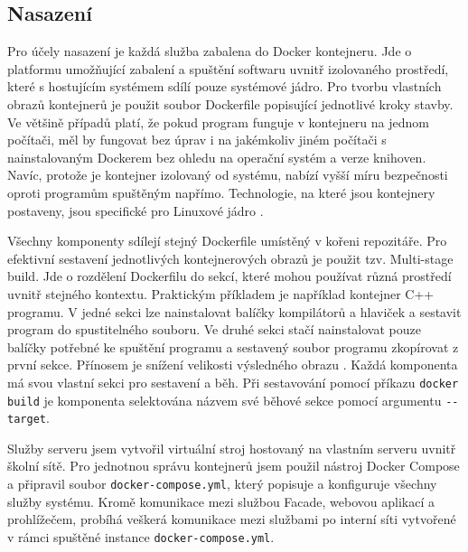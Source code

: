 \subsection{Nasazení}
Pro účely nasazení je každá služba zabalena do Docker kontejneru. Jde o platformu umožňující zabalení a spuštění softwaru uvnitř izolovaného prostředí, které s hostujícím systémem sdílí pouze systémové jádro. Pro tvorbu vlastních obrazů kontejnerů je použit soubor Dockerfile popisující jednotlivé kroky stavby. Ve většině případů platí, že pokud program funguje v kontejneru na jednom počítači, měl by fungovat bez úprav i na jakémkoliv jiném počítači s nainstalovaným Dockerem bez ohledu na operační systém a verze knihoven. Navíc, protože je kontejner izolovaný od systému, nabízí vyšší míru bezpečnosti oproti programům spuštěným napřímo. Technologie, na které jsou kontejnery postaveny, jsou specifické pro Linuxové jádro \cite{DockerOverview0200}. 

Všechny komponenty sdílejí stejný Dockerfile umístěný v kořeni repozitáře. Pro efektivní sestavení jednotlivých kontejnerových obrazů je použit tzv. Multi-stage build. Jde o rozdělení Dockerfilu do sekcí, které mohou používat různá prostředí uvnitř stejného kontextu. Praktickým příkladem je například kontejner C++ programu. V jedné sekci lze nainstalovat balíčky kompilátorů a hlaviček a sestavit program do spustitelného souboru. Ve druhé sekci stačí nainstalovat pouze balíčky potřebné ke spuštění programu a sestavený soubor programu zkopírovat z první sekce. Přínosem je snížení velikosti výsledného obrazu \cite{MultistageBuilds0100}. Každá komponenta má svou vlastní sekci pro sestavení a běh. Při sestavování pomocí příkazu \lstinline|docker build| je komponenta selektována názvem své běhové sekce pomocí argumentu \lstinline|--target|.

Služby serveru jsem vytvořil virtuální stroj hostovaný na vlastním serveru uvnitř školní sítě. Pro jednotnou správu kontejnerů jsem použil nástroj Docker Compose a připravil soubor \lstinline|docker-compose.yml|, který popisuje a konfiguruje všechny služby systému. Kromě komunikace mezi službou Facade, webovou aplikací a prohlížečem, probíhá veškerá komunikace mezi službami po interní síti vytvořené v rámci spuštěné instance \lstinline|docker-compose.yml|. 

